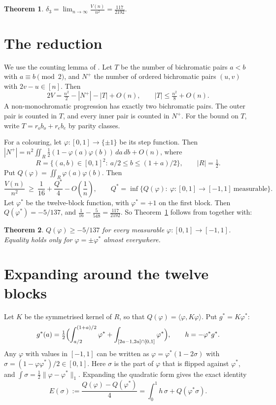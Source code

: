 \documentclass[11pt]{article}
\newtheorem{theorem}{Theorem}
\newcommand{\vphi}{\varphi}
\begin{document}
\begin{theorem}\label{thm:main}
$\displaystyle\delta_3=\lim_{n\to\infty}\frac{V(n)}{n^2}=\frac{117}{2192}.$
\end{theorem}

\section{The reduction}
We use the counting lemma of \cite{PRS}. Let $T$ be the number of bichromatic pairs $a<b$
with $a\equiv b\pmod 2$, and $N^+$ the number of ordered bichromatic pairs $(u,v)$ with
$2v-u\in[n]$. Then
\[2V=\tfrac{n^2}{2}-|N^+|-|T|+O(n),\qquad |T|\le \tfrac{n^2}{8}+O(n).\]
A non-monochromatic progression has exactly two bichromatic pairs. The outer pair is counted
in $T$, and every inner pair is counted in $N^+$. For the bound on $T$, write
$T=r_ob_o+r_eb_e$ by parity classes.

For a colouring, let $\vphi:[0,1]\to\{\pm1\}$ be its step function. Then
$|N^+|=n^2\iint_R\frac12(1-\vphi(a)\vphi(b))\,da\,db+O(n)$, where
\[R=\{(a,b)\in[0,1]^2:\ a/2\le b\le (1+a)/2\},\qquad |R|=\tfrac12 .\]
Put $Q(\vphi)=\iint_R\vphi(a)\vphi(b)$. Then
\begin{equation}\label{eq:red}
\frac{V(n)}{n^2}\ \ge\ \frac1{16}+\frac{Q^*}{4}-O\!\left(\frac1n\right),\qquad
Q^*=\inf\{Q(\vphi):\ \vphi:[0,1]\to[-1,1]\ \text{measurable}\}.
\end{equation}
Let $\vphi^*$ be the twelve-block function, with $\vphi^*=+1$ on the first block. Then
$Q(\vphi^*)=-5/137$, and $\frac1{16}-\frac5{548}=\frac{117}{2192}$. So
Theorem~\ref{thm:main} follows from \cite{PRS} together with:

\begin{theorem}\label{thm:A}
$Q(\vphi)\ge-5/137$ for every measurable $\vphi:[0,1]\to[-1,1]$. Equality holds only for
$\vphi=\pm\vphi^*$ almost everywhere.
\end{theorem}

\section{Expanding around the twelve blocks}
Let $K$ be the symmetrised kernel of $R$, so that $Q(\vphi)=\langle\vphi,K\vphi\rangle$. Put
$g^*=K\vphi^*$:
\[g^*(a)=\tfrac12\Bigl(\int_{a/2}^{(1+a)/2}\vphi^*+\int_{[2a-1,2a]\cap[0,1]}\vphi^*\Bigr),\qquad h=-\vphi^*g^*.\]
Any $\vphi$ with values in $[-1,1]$ can be written as $\vphi=\vphi^*(1-2\sigma)$ with
$\sigma=(1-\vphi\vphi^*)/2\in[0,1]$. Here $\sigma$ is the part of $\vphi$ that is flipped against
$\vphi^*$, and $\int\sigma=\frac12\|\vphi-\vphi^*\|_1$. Expanding the quadratic form gives the exact
identity
\begin{equation}\label{eq:E}
E(\sigma):=\frac{Q(\vphi)-Q(\vphi^*)}{4}=\int_0^1h\,\sigma+Q(\vphi^*\sigma).
\end{equation}
\end{document}
